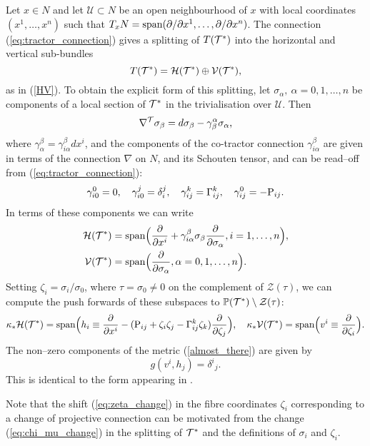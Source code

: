 Let $x\in N$ and let ${\mathcal U}\subset N$ be an open 
neighbourhood of $x$ with 
local coordinates $(x^1, \dots, x^n)$ such that
$T_xN=\mbox{span}(\partial/\partial x^1, \dots, \partial/\partial x^n)$. The connection 
(\ref{eq:tractor_connection}) gives a splitting of $T(\mathcal{T}^*)$ into the horizontal and
vertical sub-bundles
\[
T(\mathcal{T}^*)=\mathcal{H}(\mathcal{T}^*)\oplus \mathcal{V}(\mathcal{T}^*),
\]
as in (\ref{HV}).
To obtain the explicit form of this splitting, let $\sigma_\alpha,\ \alpha=0, 1, \dots, n$ be components of a local section of $\mathcal{T}^*$ in the trivialisation over ${\mathcal{U}}$.
Then
\[
\nabla^{\mathcal{T}} \sigma_\beta=d \sigma_\beta-\gamma_{\beta}^{\alpha} \sigma_\alpha,
\]
where $\gamma_{\alpha}^\beta= \gamma_{i\alpha}^\beta dx^i$, and the components
of the co-tractor connection 
$\gamma_{i\alpha}^\beta$  are given in terms of the connection
$\nabla$ on $N$, and its Schouten tensor, and 
can be read--off from (\ref{eq:tractor_connection}):
\[
\gamma_{i0}^0=0, \quad \gamma_{i0}^j=\delta_i^j,\quad
\gamma_{ij}^k=\Gamma_{ij}^k, \quad \gamma_{ij}^0=-\mathrm{P}_{ij}.
\]
In terms of these components we can write
\begin{align*}
\mathcal{H}(\mathcal{T}^*)&=\mbox{span}
\Big( \frac{\partial}{\partial x^i}+ {\gamma_{i\alpha}^\beta} \sigma_\beta
\frac{\partial}{\partial \sigma_{\alpha}}, i=1, \dots, n \Big), \\
 \mathcal{V}(\mathcal{T}^*)&=\mbox{span}\Big(\frac{\partial}{\partial \sigma_{\alpha}}, \alpha=0, 1, 
\dots, n\Big).
\end{align*}
Setting $\zeta_i=\sigma_i/\sigma_0$, where $\tau=\sigma_0\neq 0$ %
on the complement of 
$\mathcal{Z}(\tau)$, 
  we can compute the push forwards
of these subspaces to $\mathbb{P}(\mathcal{T}^*)\setminus {\mathcal{Z}(\tau)}$:
\[
\kappa_* \mathcal{H}(\mathcal{T}^*)=\mbox{span}\Big(h_i\equiv
\frac{\partial}{\partial x^i}-
(\mathrm{P}_{ij}+\zeta_i\zeta_j  -\Gamma_{ij}^k\zeta_k)\frac{\partial}{\partial \zeta_j}
\Big), \quad \kappa_* \mathcal{V}(\mathcal{T}^*)=\mbox{span}\Big(v^i\equiv\frac{\partial}{\partial \zeta_i}
\Big).
\]
The non--zero components of the  metric (\ref{almost_there}) are given by
\[
g(v^i, h_j)={\delta^i}_j.
\]
This is identical to the form appearing in \cite{DM}.
\koniec

\begin{rmk}
Note that the shift (\ref{eq:zeta_change}) in the fibre coordinates $\zeta_{i}$ corresponding to a change of projective connection can be motivated from the change (\ref{eq:chi_mu_change}) in the splitting of $\mathcal{T}^*$ and the definitions of $\sigma_i$ and $\zeta_i$.
\end{rmk}

